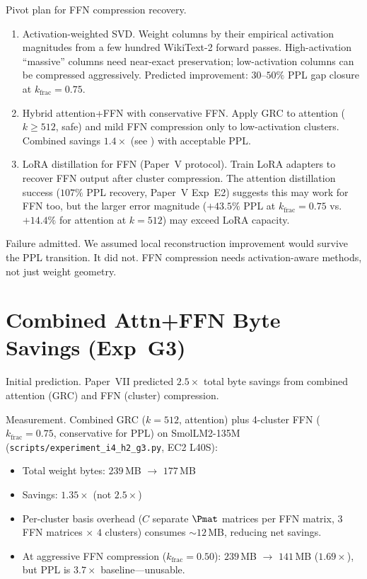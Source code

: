\documentclass[11pt]{article}
\begin{document}
Pivot plan for FFN compression recovery.
\begin{enumerate}
\item Activation-weighted SVD.  Weight columns by their empirical
      activation magnitudes from a few hundred WikiText-2 forward passes.
      High-activation ``massive'' columns need near-exact preservation;
      low-activation columns can be compressed aggressively.  Predicted
      improvement: $30$--$50\%$ PPL gap closure at $k_\text{frac}{=}0.75$.
\item Hybrid attention+FFN with conservative FFN.  Apply GRC
      to attention ($k{\ge}512$, safe) and mild FFN compression only to
      low-activation clusters.  Combined savings $1.4{\times}$ (see
      ) with acceptable PPL.
\item LoRA distillation for FFN (Paper~V protocol).  Train LoRA
      adapters to recover FFN output after cluster compression.  The
      attention distillation success ($107\%$ PPL recovery, Paper~V Exp~E2)
      suggests this may work for FFN too, but the larger error magnitude
      ($+43.5\%$ PPL at $k_\text{frac}{=}0.75$ vs.\ $+14.4\%$ for
      attention at $k{=}512$) may exceed LoRA capacity.
\end{enumerate}

Failure admitted.  We assumed local reconstruction improvement
would survive the PPL transition.  It did not.  FFN compression needs
activation-aware methods, not just weight geometry.

\section{Combined Attn+FFN Byte Savings (Exp~G3)}
\label{sec:g3-combined}

Initial prediction.  Paper~VII predicted $2.5{\times}$ total byte
savings from combined attention (GRC) and FFN (cluster) compression.

Measurement.  Combined GRC ($k{=}512$, attention) plus 4-cluster
FFN ($k_\text{frac}{=}0.75$, conservative for PPL) on SmolLM2-135M
(\texttt{scripts/experiment\_i4\_h2\_g3.py}, EC2 L40S):
\begin{itemize}
\item Total weight bytes: $239$\,MB $\to$ $177$\,MB
\item Savings: $1.35{\times}$ (not $2.5{\times}$)
\item Per-cluster basis overhead ($C$ separate $\Pmat$ matrices per FFN
      matrix, $3$ FFN matrices $\times$ $4$ clusters) consumes
      ${\sim}12$\,MB, reducing net savings.
\item At aggressive FFN compression ($k_\text{frac}{=}0.50$):
      $239$\,MB $\to$ $141$\,MB ($1.69{\times}$), but PPL is
      $3.7{\times}$ baseline---unusable.
\end{itemize}
\end{document}
